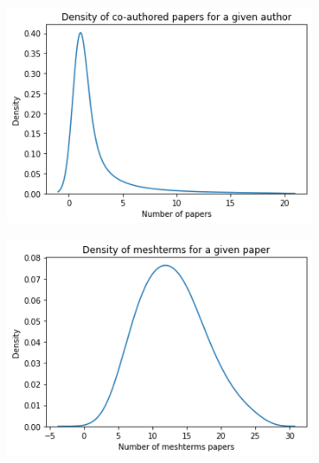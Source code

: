 \begin{figure}[H]
\centering
\begin{subfigure}{.5\textwidth}
  \centering
  \includegraphics[width=1\linewidth]{3_chapter3/figures/density_author.png}
  \caption{}
  \label{fig:sub1}
\end{subfigure}%
\begin{subfigure}{.5\textwidth}
  \centering
  \includegraphics[width=1\linewidth]{3_chapter3/figures/density_meshterms.png}
  \caption{}
  \label{fig:sub2}
\end{subfigure}
\begin{subfigure}{.5\textwidth}
  \centering

\end{subfigure}
\end{figure}
